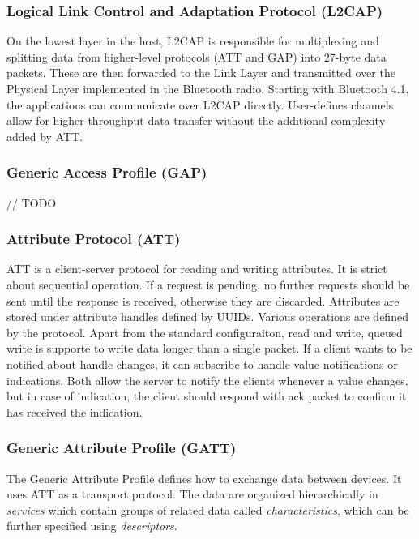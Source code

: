 \subsubsection{Logical Link Control and Adaptation Protocol (L2CAP)}

On the lowest layer in the host, L2CAP is responsible for multiplexing and splitting data from higher-level protocols (ATT and GAP) into 27-byte data packets. These are then forwarded to the Link Layer and transmitted over the Physical Layer implemented in the Bluetooth radio. Starting with Bluetooth 4.1, the applications can communicate over L2CAP directly. User-defines channels allow for higher-throughput data transfer without the additional complexity added by ATT.


\subsubsection{Generic Access Profile (GAP)}
// TODO

\subsubsection{Attribute Protocol (ATT)}
ATT is a client-server protocol for reading and writing attributes. It is strict about sequential operation. If a request is pending, no further requests should be sent until the response is received, otherwise they are discarded. Attributes are stored under attribute handles defined by UUIDs. Various operations are defined by the protocol. Apart from the standard configuraiton, read and write, queued write is supporte to write data longer than a single packet. If a client wants to be notified about handle changes, it can subscribe to handle value notifications or indications. Both allow the server to notify the clients whenever a value changes, but in case of indication, the client should respond with ack packet to confirm it has received the indication.

\subsubsection{Generic Attribute Profile (GATT)}

The Generic Attribute Profile defines how to exchange data between devices. It uses ATT as a transport protocol. The data are organized hierarchically in \textit{services} which contain groups of related data called \textit{characteristics}, which can be further specified using \textit{descriptors}.

